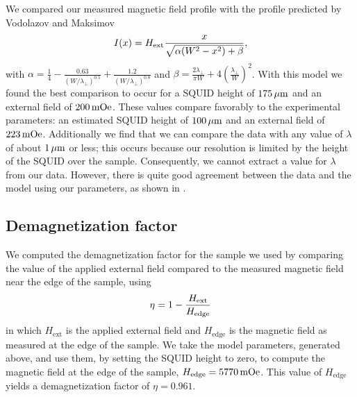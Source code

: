 We compared our measured magnetic field profile with the 
profile predicted by Vodolazov
and Maksimov
%
\begin{equation}
I(x)=H_{\mathrm{ext}} {x \over \sqrt{\alpha (W^2-x^2)+\beta}},
\end{equation}
%
with $\alpha = \frac{1}{4} - \frac{0.63}{(W/\lambda_\perp)^{0.5}} 
+ \frac{1.2}{(W/\lambda_\perp)^{0.8}}$ and 
$\beta = \frac{2 \lambda_\perp}{\pi W} + 4(\frac{\lambda_\perp}{W})^2$. 
With this model we found the best comparison to occur for 
a SQUID height of $175\,\mu\mathrm{m}$
and an external field of $200\,\mathrm{mOe}$. These values compare 
favorably to the experimental parameters: an estimated 
SQUID height of $100\,\mu\mathrm{m}$ and an external
field of $223\,\mathrm{mOe}$.  
Additionally we find that we can compare the data with any value of 
$\lambda$ of about $1\,\mu\mathrm{m}$ or less; this occurs because
our resolution is limited by the height of the SQUID over the sample.
Consequently, we cannot extract a value for $\lambda$ from our
data. However, there is quite good agreement between the data and
the model using our parameters, as shown in .

%
  

\subsection{Demagnetization factor}
%
%

%
%
We computed the demagnetization factor for the sample we used
by comparing the value of the applied external field  compared
to the measured magnetic field near the edge of the sample, using 
%
\begin{equation}
\eta = 1 - {H_{\mathrm{ext}} \over H_{\mathrm{edge}}}
\label{eqn:demag_def}
\end{equation}
%
in which $H_{\mathrm{ext}}$ is the applied external field and
$H_{\mathrm{edge}} $ is the magnetic field as measured at
the edge of the sample. 
We take the model parameters, generated above,
and use them, by setting the SQUID height to zero, to compute
the magnetic field at the edge of the sample, $H_{\mathrm{edge}}=5770\,\mathrm{mOe}$.
This value of $H_{\mathrm{edge}}$ yields a demagnetization factor of 
$\eta = 0.961$. 

